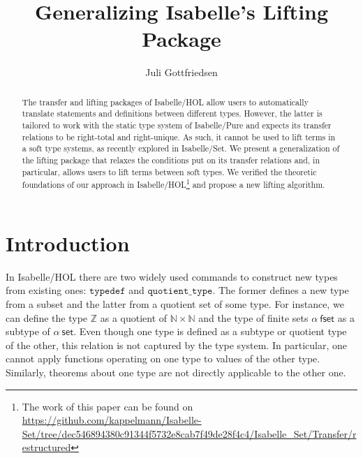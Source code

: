 \documentclass{article}
\title{Generalizing Isabelle's Lifting Package}
\date{}
\author{Juli Gottfriedsen}
\theoremstyle{definition}
\newcommand{\nat}{\mathbb{N}}
\newcommand{\inte}{\mathbb{Z}}
\begin{document}
\maketitle
\begin{abstract}
The transfer and lifting packages of Isabelle/HOL
allow users to automatically translate statements and definitions between different types.
However, the latter is tailored to work with the static type system of Isabelle/Pure
and expects its transfer relations to be right-total and right-unique.
As such, it cannot be used to lift terms in a soft type systems,
as recently explored in Isabelle/Set.
We present a generalization of the lifting package that
relaxes the conditions put on its transfer relations and,
in particular,
allows users to lift terms between soft types.
We verified the theoretic foundations of our approach in Isabelle/HOL\footnote{The work of this paper can be found on \url{https://github.com/kappelmann/Isabelle-Set/tree/dec546894380c91344f5732e8cab7f49de28f4c4/Isabelle_Set/Transfer/restructured}}
and propose a new lifting algorithm.
\end{abstract}

\section{Introduction}
In Isabelle/HOL there are two widely used commands to construct new types from existing ones: \(\mathtt{typedef}\) and \(\mathtt{quotient\_type}\).
The former defines a new type from a subset and the latter from a quotient set of some type.
For instance, we can define the type \(\inte\) as a quotient of \(\nat \times \nat\) and the type of finite sets \(\alpha\ \mathsf{fset}\) as a subtype of \(\alpha\ \mathsf{set}\). Even though one type is defined as a subtype or quotient type of the other,
this relation is not captured by the type system.
In particular, one cannot apply functions operating on one type to values of the other type.
Similarly, theorems about one type are not directly applicable to the other one.
\end{document}
